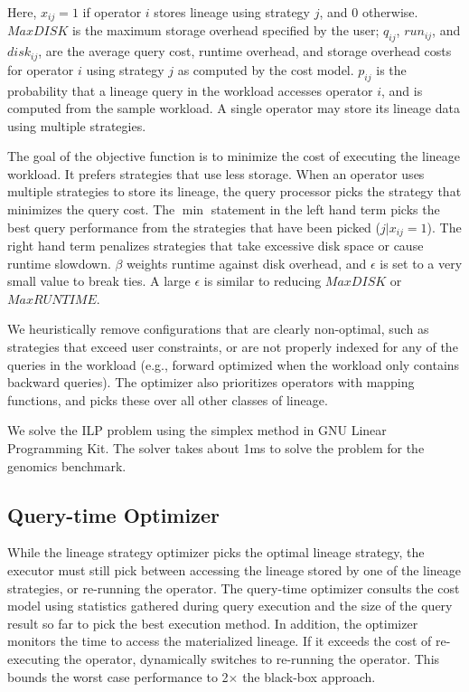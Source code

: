 Here, $x_{ij} = 1$ if operator $i$ stores lineage using strategy $j$, and 0
otherwise.  $MaxDISK$ is the maximum storage overhead specified by the user;
$q_{ij}$, $run_{ij}$, and $disk_{ij}$, are the average query cost, runtime
overhead, and storage overhead costs for operator $i$ using strategy $j$ as
computed by the cost model.  $p_{ij}$ is the probability that a lineage
query in the workload accesses operator $i$, and is computed from the sample
workload.  A single operator may store its lineage data using multiple
strategies.

The goal of the objective function is to minimize the cost of executing the
lineage workload.  It prefers strategies that use less storage.  When an
operator uses multiple strategies to store its lineage, the query processor
picks the strategy that minimizes the query cost.  The $\min$ statement in the
left hand term picks the best query performance from the strategies that have
been picked ($j | x_{ij} = 1$).  The right hand term penalizes strategies that
take excessive disk space or cause runtime slowdown.  $\beta$ weights runtime
against disk overhead, and $\epsilon$ is set to a very small value to break
ties. A large $\epsilon$ is similar to reducing $MaxDISK$ or $MaxRUNTIME$.

We heuristically remove configurations that are clearly non-optimal, such as
strategies that exceed user constraints, or are not properly indexed for any of
the queries in the workload (e.g., forward optimized when the workload only
contains backward queries).  The optimizer also prioritizes operators with
mapping functions, and picks these over all other classes of lineage.

We solve the ILP problem using the simplex method in GNU Linear Programming
Kit.  The solver takes about 1ms to solve the problem for the genomics
benchmark.




\subsection{Query-time Optimizer}
\label{s:cmopt}

While the lineage strategy optimizer picks the optimal lineage strategy, the
executor must still pick between accessing the lineage stored by one of the
lineage strategies, or re-running the operator.  The query-time optimizer
consults the cost model using statistics gathered during query execution and
the size of the query result so far to pick the best execution method.  In
addition, the optimizer monitors the time to access the materialized lineage.
If it exceeds the cost of re-executing the operator, \sys{} dynamically
switches to re-running the operator.  This bounds the worst case performance to
2$\times$ the black-box approach.


